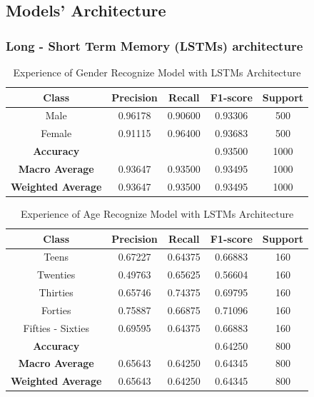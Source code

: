 \documentclass[conference, 10pt,onecolumn]{IEEEtran}
\begin{document}
\subsection{Models' Architecture}
\subsubsection{Long - Short Term Memory (LSTMs) architecture}

\begin{table}[htbp]
    \centering
    \begin{tabular}{|c|cccc|}
        \hline
        \textbf{Class} & \textbf{Precision} & \textbf{Recall} & \textbf{F1-score} & \textbf{Support} \\
        \hline
        Male & 0.96178 & 0.90600 & 0.93306 & 500 \\
        Female & 0.91115 & 0.96400 & 0.93683 & 500 \\
        \hline
        \textbf{Accuracy} & \multicolumn{2}{c}{} & 0.93500 & 1000 \\
        \textbf{Macro Average} & 0.93647 & 0.93500 & 0.93495 & 1000 \\
        \textbf{Weighted Average} & 0.93647 & 0.93500 & 0.93495 & 1000 \\
        \hline
    \end{tabular}
    \caption{Experience of Gender Recognize Model with LSTMs Architecture}
    \label{tab:Experience of Gender Recognize Model with LSTM Architecture}
\end{table}

\begin{table}[htbp]
    \centering
    \begin{tabular}{|c|cccc|}
        \hline
        \textbf{Class} & \textbf{Precision} & \textbf{Recall} & \textbf{F1-score} & \textbf{Support} \\
        \hline
        Teens & 0.67227 & 0.64375 & 0.66883 & 160 \\
        Twenties & 0.49763 & 0.65625 & 0.56604 & 160 \\
        Thirties & 0.65746 & 0.74375 & 0.69795 & 160 \\
        Forties & 0.75887 & 0.66875 & 0.71096 & 160 \\
        Fifties - Sixties& 0.69595 & 0.64375 & 0.66883 & 160 \\
        \hline
        \textbf{Accuracy} &  && 0.64250 & 800 \\
        \textbf{Macro Average} & 0.65643 & 0.64250 & 0.64345 & 800 \\
        \textbf{Weighted Average} & 0.65643 & 0.64250 & 0.64345  & 800 \\
        \hline
    \end{tabular}
    \caption{Experience of Age Recognize Model with LSTMs Architecture}
    \label{tab:Experience of Age Recognize Model with LSTMs Architecture}
\end{table}
\end{document}
